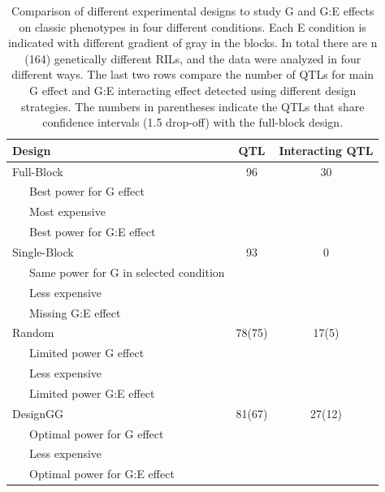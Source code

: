 \begin{table}[!ht]
  \begin{center}
  {\footnotesize
  \begin{tabular}{ l  c  c }
    \hline
    {\bf Design} & {\bf QTL} & {\bf Interacting QTL}\\
    \hline
    Full-Block     & 96     & 30\\
    \ \ \ Best power for G effect & &\\
    \ \ \ Most expensive & &\\
    \ \ \ Best power for G:E effect & &\\

    Single-Block   & 93     & 0\\
    \ \ \ Same power for G in selected condition & &\\
    \ \ \ Less expensive & &\\
    \ \ \ Missing G:E effect & &\\
    Random         & 78(75) & 17(5)\\
    \ \ \ Limited power G effect & &\\
    \ \ \ Less expensive & &\\
    \ \ \ Limited power G:E effect & &\\
    DesignGG       & 81(67) & 27(12)\\
    \ \ \ Optimal power for G effect & &\\
    \ \ \ Less expensive & &\\
    \ \ \ Optimal power for G:E effect & &\\
    \hline
  \end{tabular}
  }
  \end{center}
  \caption[Comparing different experimental designs]{Comparison of different experimental designs to study G and G:E effects 
  		  on classic phenotypes in four different conditions. Each E condition is indicated with different gradient of gray 
  		  in the blocks. In total there are n (164) genetically different RILs, and the data were analyzed in four different 
  		  ways. The last two rows compare the number of QTLs for main G effect and G:E interacting effect detected using 
  		  different design strategies. The numbers in parentheses indicate the QTLs that share confidence intervals (1.5 
  		  drop-off) with the full-block design.}
    \label{table:designs}
\end{table}

